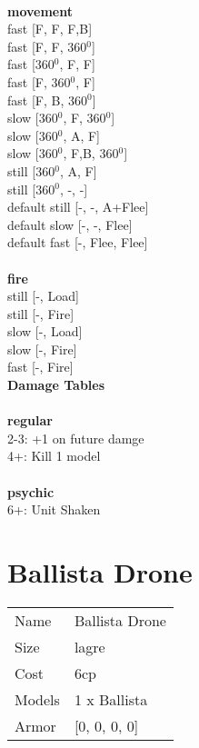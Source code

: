 \ \\ {\bf movement } \\
fast [F, F, F,B] \\
fast [F, F, 360$^0$] \\
fast [360$^0$, F, F] \\
fast [F, 360$^0$, F] \\
fast [F, B, 360$^0$] \\
slow [360$^0$, F, 360$^0$] \\
slow [360$^0$, A, F] \\
slow [360$^0$, F,B, 360$^0$] \\
still [360$^0$, A, F] \\
still [360$^0$, -, -] \\
default still [-, -, A+Flee] \\
default slow [-, -, Flee] \\
default fast [-, Flee, Flee] \\
\ \\ {\bf fire } \\
still [-, Load] \\
still [-, Fire] \\
slow [-, Load] \\
slow [-, Fire] \\
fast [-, Fire] \\


{\bf Damage Tables} \\
\ \\ {\bf regular } \\
2-3: +1 on future damge \\
4+: Kill 1 model \\
\ \\ {\bf psychic } \\
6+: Unit Shaken \\










\pagebreak\pagebreak

\section{ Ballista Drone }

\begin{tabular}{ll}
  Name & Ballista Drone \\
  Size & lagre\\
  Cost & 6cp\\
  Models & 1 x Ballista\\
  Armor & [0, 0, 0, 0]\\
\end{tabular}

